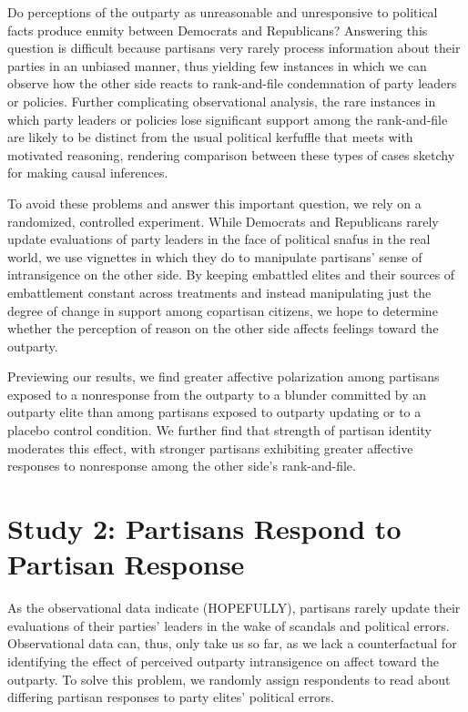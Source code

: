 \documentclass[12pt]{article}
\begin{document}
Do perceptions of the outparty as unreasonable and unresponsive to political facts produce enmity between Democrats and Republicans? Answering this question is difficult because partisans very rarely process information about their parties in an unbiased manner, thus yielding few instances in which we can observe how the other side reacts to rank-and-file condemnation of party leaders or policies. Further complicating observational analysis, the rare instances in which party leaders or policies lose significant support among the rank-and-file are likely to be distinct from the usual political kerfuffle that meets with motivated reasoning, rendering comparison between these types of cases sketchy for making causal inferences. 

To avoid these problems and answer this important question, we rely on a randomized, controlled experiment. While Democrats and Republicans rarely update evaluations of party leaders in the face of political snafus in the real world, we use vignettes in which they do to manipulate partisans' sense of intransigence on the other side. By keeping embattled elites and their sources of embattlement constant across treatments and instead manipulating just the degree of change in support among copartisan citizens, we hope to determine whether the perception of reason on the other side affects feelings toward the outparty.

Previewing our results, we find greater affective polarization among partisans exposed to a nonresponse from the outparty to a blunder committed by an outparty elite than among partisans exposed to outparty updating or to a placebo control condition. We further find that strength of partisan identity moderates this effect, with stronger partisans exhibiting greater affective responses to nonresponse among the other side's rank-and-file.

\section*{Study 2: Partisans Respond to Partisan Response}
As the observational data indicate (HOPEFULLY), partisans rarely update their evaluations of their parties' leaders in the wake of scandals and political errors. Observational data can, thus, only take us so far, as we lack a counterfactual for identifying the effect of perceived outparty intransigence on affect toward the outparty. To solve this problem, we randomly assign respondents to read about differing partisan responses to party elites' political errors. 
\end{document}
